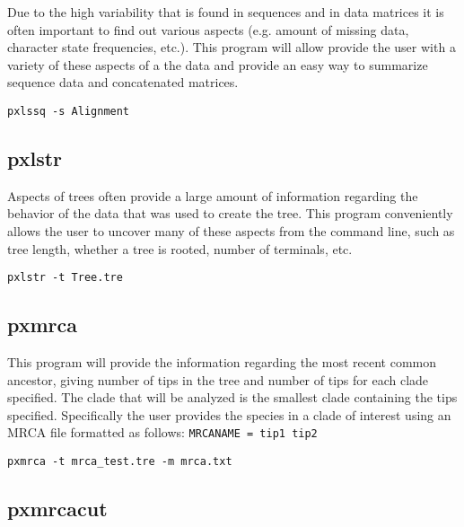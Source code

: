 \documentclass[12pt,letterpaper]{memoir}
\begin{document}
Due to the high variability that is found in sequences and in data matrices it is often important to find out various aspects (e.g. amount of missing data, character state frequencies, etc.). This program will allow provide the user with a variety of these aspects of a the data and provide an easy way to summarize sequence data and concatenated matrices.

\begin{flushleft}
\begin{verbatim}
pxlssq -s Alignment
\end{verbatim}
\end{flushleft}

\subsection{pxlstr}

Aspects of trees often provide a large amount of information regarding the behavior of the data that was used to create the tree. This program conveniently allows the user to uncover many of these aspects from the command line, such as tree length, whether a tree is rooted, number of terminals, etc.

\begin{flushleft}
\begin{verbatim}
pxlstr -t Tree.tre
\end{verbatim}
\end{flushleft}

\subsection{pxmrca}

This program will provide the information regarding the most recent common ancestor, giving number of tips in the tree and number of tips for each clade specified. The clade that will be analyzed is the smallest clade containing the tips specified. Specifically the user provides the species in a clade of interest using an MRCA file formatted as follows:
\texttt{MRCANAME = tip1 tip2}

\begin{flushleft}
\begin{verbatim}
pxmrca -t mrca_test.tre -m mrca.txt
\end{verbatim}
\end{flushleft}


\subsection{pxmrcacut}
\end{document}
